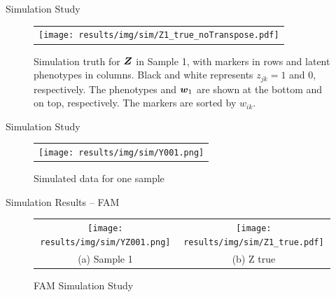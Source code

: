 \documentclass[ignorenonframetext,]{beamer}
\newcommand{\true}{{\mbox{\tiny TR}}}
\newcommand{\bZ}{\mbox{\boldmath $Z$}}
\newcommand{\bw}{\mbox{\boldmath $w$}}
\begin{document}
\begin{frame}{Simulation Study}
\begin{figure}
\begin{center}
\begin{tabular}{c}
\texttt{[image: results/img/sim/Z1\_true\_noTranspose.pdf]}
\end{tabular}
\end{center}
\vspace{-0.05in} \caption{Simulation truth for $\bZ$ in Sample 1, with markers in
rows and latent phenotypes in columns. Black and white represents
$z_{jk}=1$ and 0, respectively. The phenotypes and $\bw_1$ are
shown at the bottom and on top, respectively. The markers
are sorted by $w_{ik}$.}
\end{figure}
\end{frame}

\begin{frame}{Simulation Study}
\begin{figure}
\begin{center}
\begin{tabular}{c}
\texttt{[image: results/img/sim/Y001.png]}
\end{tabular}
\end{center}
\vspace{-0.05in} \caption{Simulated data for one sample}
\end{figure}
\end{frame}

\begin{frame}{Simulation Results -- FAM}
\vspace{-1em}\begin{figure}
  \begin{center}
  \begin{tabular}{cc}
  \texttt{[image: results/img/sim/YZ001.png]}&
  \texttt{[image: results/img/sim/Z1\_true.pdf]}\\
  {\small (a) Sample 1} & {\small(b) Z true} \\
  \end{tabular}
  \end{center}
  \vspace{-0.05in}
  \caption{FAM Simulation Study}
\end{figure}
\end{frame}
\end{document}
